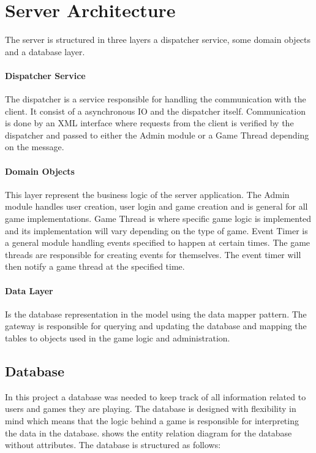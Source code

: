 \section{Server Architecture}\label{sec:server}
The server is structured in three layers a dispatcher service, some domain objects and a database layer. 

\paragraph{Dispatcher Service}
The dispatcher is a service responsible for handling the communication with the client. It consist of a asynchronous IO and the dispatcher itself. Communication is done by an XML interface where requests from the client is verified by the dispatcher and passed to either the Admin module or a Game Thread depending on the message. 

\paragraph{Domain Objects}
This layer represent the business logic of the server application. The Admin module handles user creation, user login and game creation and is general for all game implementations. Game Thread is where specific game logic is implemented and its implementation will vary depending on the type of game. Event Timer is a general module handling events specified to happen at certain times. The game threads are responsible for creating events for themselves. The event timer will then notify a game thread at the specified time.

\paragraph{Data Layer}
Is the database representation in the model using the data mapper pattern. The gateway is responsible for querying and updating the database and mapping the tables to objects used in the game logic and administration.



\subsection{Database}
In this project a database was needed to keep track of all information related to users and games they are playing. The database is designed with flexibility in mind which means that the logic behind a game is responsible for interpreting the data in the database.  shows the entity relation diagram for the database without attributes. The database is structured as follows:

